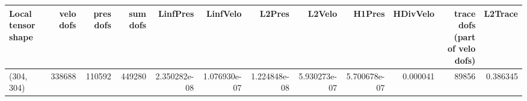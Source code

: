 \begin{tabular}{lrrrrrrrrrrr}
\toprule
Local tensor shape &  velo dofs &  pres dofs &  sum dofs &     LinfPres &     LinfVelo &       L2Pres &       L2Velo &       H1Pres &  HDivVelo &  trace dofs (part of velo dofs) &  L2Trace \\
\midrule
        (304, 304) &     338688 &     110592 &    449280 & 2.350282e-08 & 1.076930e-07 & 1.224848e-08 & 5.930273e-07 & 5.700678e-07 &  0.000041 &                           89856 & 0.386345 \\
\bottomrule
\end{tabular}
